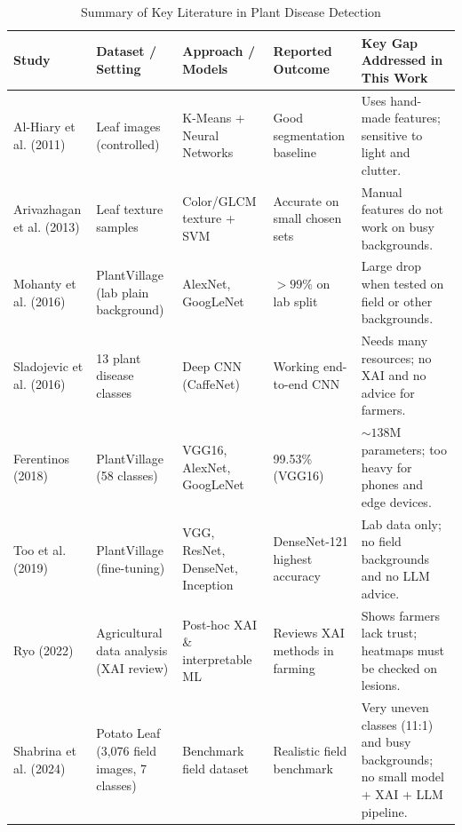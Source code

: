 \begin{table}[htbp]
\caption{Summary of Key Literature in Plant Disease Detection}
\label{tab:lit_summary}
\begin{center}
\scriptsize
\begin{tabularx}{\textwidth}{| p{2.2cm} | p{2.4cm} | p{2.7cm} | p{2.3cm} | X |}
\hline
\textbf{Study} & \textbf{Dataset / Setting} & \textbf{Approach / Models} & \textbf{Reported Outcome} & \textbf{Key Gap Addressed in This Work} \\
\hline
Al-Hiary et al. (2011) \cite{alhiary2011fast} & Leaf images (controlled) & K-Means + Neural Networks & Good segmentation baseline & Uses hand-made features; sensitive to light and clutter. \\
\hline
Arivazhagan et al. (2013) \cite{arivazhagan2013detection} & Leaf texture samples & Color/GLCM texture + SVM & Accurate on small chosen sets & Manual features do not work on busy backgrounds. \\
\hline
Mohanty et al. (2016) \cite{mohanty2016using} & PlantVillage (lab plain background) & AlexNet, GoogLeNet & $>99\%$ on lab split & Large drop when tested on field or other backgrounds. \\
\hline
Sladojevic et al. (2016) \cite{sladojevic2016deep} & 13 plant disease classes & Deep CNN (CaffeNet) & Working end-to-end CNN & Needs many resources; no XAI and no advice for farmers. \\
\hline
Ferentinos (2018) \cite{ferentinos2018deep} & PlantVillage (58 classes) & VGG16, AlexNet, GoogLeNet & 99.53\% (VGG16) & $\sim 138$M parameters; too heavy for phones and edge devices. \\
\hline
Too et al. (2019) \cite{too2019comparative} & PlantVillage (fine-tuning) & VGG, ResNet, DenseNet, Inception & DenseNet-121 highest accuracy & Lab data only; no field backgrounds and no LLM advice. \\
\hline
Ryo (2022) \cite{ryo2022explainable} & Agricultural data analysis (XAI review) & Post-hoc XAI \& interpretable ML & Reviews XAI methods in farming & Shows farmers lack trust; heatmaps must be checked on lesions. \\
\hline
Shabrina et al. (2024) \cite{shabrina2024novel} & Potato Leaf (3,076 field images, 7 classes) & Benchmark field dataset & Realistic field benchmark & Very uneven classes (11:1) and busy backgrounds; no small model + XAI + LLM pipeline. \\
\hline
\end{tabularx}
\end{center}
\end{table}

